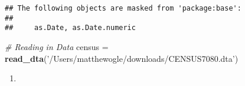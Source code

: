 \documentclass[
  12pt,
  landscape]{article}
\newenvironment{Shaded}{\begin{snugshade}}{\end{snugshade}}
\newcommand{\CommentTok}[1]{\textcolor[rgb]{0.56,0.35,0.01}{\textit{#1}}}
\newcommand{\KeywordTok}[1]{\textcolor[rgb]{0.13,0.29,0.53}{\textbf{#1}}}
\newcommand{\NormalTok}[1]{#1}
\newcommand{\StringTok}[1]{\textcolor[rgb]{0.31,0.60,0.02}{#1}}
\begin{document}
\begin{verbatim}
## The following objects are masked from 'package:base':
## 
##     as.Date, as.Date.numeric
\end{verbatim}

\begin{Shaded}
\begin{Highlighting}[]
\CommentTok{# Reading in Data}
\NormalTok{census =}\StringTok{ }\KeywordTok{read_dta}\NormalTok{(}\StringTok{'/Users/matthewogle/downloads/CENSUS7080.dta'}\NormalTok{)}
\end{Highlighting}
\end{Shaded}

\begin{enumerate}
\def\labelenumi{(\alph{enumi})}
\setcounter{enumi}{7}
\item
\end{enumerate}
\end{document}

